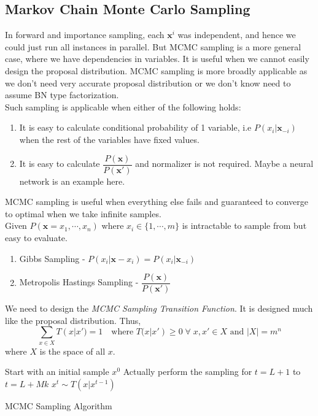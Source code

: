 \subsection{Markov Chain Monte Carlo Sampling}
In forward and importance sampling, each $\mathbf x^i$ was independent, and hence we could just run all instances in parallel. But MCMC sampling is a more general case, where we have dependencies in variables. It is useful when we cannot easily design the proposal distribution. MCMC sampling is more broadly applicable as we don't need very accurate proposal distribution or we don't know need to assume BN type factorization. \\
Such sampling is applicable when either of the following holds:
\begin{enumerate}
	\item It is easy to calculate conditional probability of 1 variable, i.e $P(x_i | \mathbf x_{-i})$ when the rest of the variables have fixed values.
	\item It is easy to calculate $\dfrac{P(\mathbf x)}{P(\mathbf x')}$ and normalizer is not required. Maybe a neural network is an example here.
\end{enumerate}
MCMC sampling is useful when everything else fails and guaranteed to converge to optimal when we take infinite samples. \\
Given $P(\mathbf x = x_1, \cdots, x_n)$ where $x_i \in \{1, \cdots, m\}$ is intractable to sample from but easy to evaluate.
\begin{enumerate}
	\item Gibbs Sampling - $P(x_i | \mathbf x - x_i) = P(x_i | \mathbf x_{-i})$
	\item Metropolis Hastings Sampling - $\dfrac{P(\mathbf x)}{P(\mathbf x')}$
\end{enumerate}
We need to design the \textit{MCMC Sampling Transition Function}. It is designed much like the proposal distribution. Thus,
\begin{equation}
\sum_{x \in X} T(x | x') = 1 \quad \text{where } T(x | x') \geq 0 \; \forall \; x, x' \in X \text{ and } |X| = m^n
\end{equation}
where $X$ is the space of all $x$. \\
\begin{algorithm}[H]\label{alg:s-mcmc}
	\DontPrintSemicolon
	Start with an initial sample $x^0$\;
	Actually perform the sampling for $t = L+1$ to $t = L + Mk$\;
	$x^t \sim T(x | x^{t-1})$ \;
	\caption{MCMC Sampling Algorithm}
\end{algorithm}
